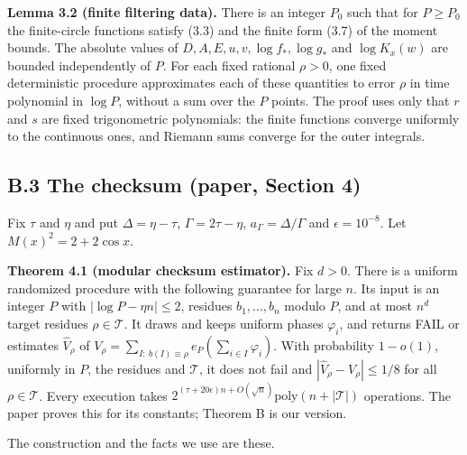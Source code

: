 \documentclass[10pt,a4paper]{article}
\begin{document}
\textbf{Lemma 3.2 (finite filtering data).} There is an integer $P_0$ such that for $P \ge P_0$ the finite-circle functions
satisfy (3.3) and the finite form (3.7) of the moment bounds. The absolute values of $D, A, E, u, v, \log f_*, \log g_*$ and
$\log K_x(w)$ are bounded independently of $P$. For each fixed rational $\rho > 0$, one fixed deterministic procedure
approximates each of these quantities to error $\rho$ in time polynomial in $\log P$, without a sum over the $P$ points.
The proof uses only that $r$ and $s$ are fixed trigonometric polynomials: the finite functions converge uniformly to the
continuous ones, and Riemann sums converge for the outer integrals.

\subsection*{B.3 The checksum (paper, Section 4)}

Fix $\tau$ and $\eta$ and put $\Delta = \eta - \tau$, $\Gamma = 2\tau - \eta$, $a_\Gamma = \Delta/\Gamma$ and
$\epsilon = 10^{-8}$. Let $M(x)^2 = 2 + 2\cos x$.

\textbf{Theorem 4.1 (modular checksum estimator).} Fix $d > 0$. There is a uniform randomized procedure with the following
guarantee for large $n$. Its input is an integer $P$ with $|\log P - \eta n| \le 2$, residues $b_1, \dots, b_n$ modulo $P$,
and at most $n^d$ target residues $\rho \in \mathcal T$. It draws and keeps uniform phases $\varphi_i$, and returns FAIL or
estimates $\hat V_\rho$ of $V_\rho = \sum_{I:\ b(I)\equiv\rho}e_P(\sum_{i\in I}\varphi_i)$. With probability $1 - o(1)$,
uniformly in $P$, the residues and $\mathcal T$, it does not fail and $|\hat V_\rho - V_\rho| \le 1/8$ for all
$\rho \in \mathcal T$. Every execution takes $2^{(\tau + 20\epsilon)n + O(\sqrt n)}\mathrm{poly}(n + |\mathcal T|)$
operations. The paper proves this for its constants; Theorem B is our version.

The construction and the facts we use are these.
\end{document}
